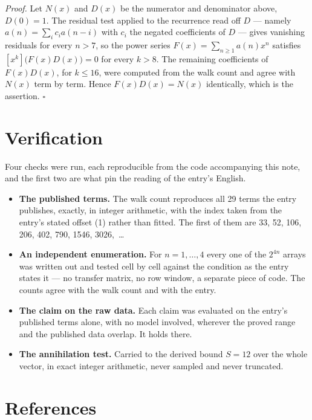 \documentclass[11pt]{article}
\theoremstyle{definition}
\begin{document}
{\itshape Proof.} Let $N(x)$ and $D(x)$ be the numerator and denominator above, $D(0)=1$. The residual test applied to the recurrence read off $D$ --- namely $a(n) = \sum_i c_i a(n-i)$ with $c_i$ the negated coefficients of $D$ --- gives vanishing residuals for every $n > 7$, so the power series $F(x)=\sum_{n\ge 1}a(n)x^n$ satisfies $[x^k]\bigl(F(x)D(x)\bigr) = 0$ for every $k > 8$. The remaining coefficients of $F(x)D(x)$, for $k \le 16$, were computed from the walk count and agree with $N(x)$ term by term. Hence $F(x)D(x) = N(x)$ identically, which is the assertion. $\square$

\section{Verification}

Four checks were run, each reproducible from the code accompanying this note, and the first two are what pin the reading of the entry's English.

\begin{itemize}

\item {\bfseries The published terms.} The walk count reproduces all 29 terms the entry publishes, exactly, in integer arithmetic, with the index taken from the entry's stated offset (1) rather than fitted. The first of them are 33, 52, 106, 206, 402, 790, 1546, 3026,~\dots

\item {\bfseries An independent enumeration.} For $n = 1,\dots,4$ every one of the $2^{4n}$ arrays was written out and tested cell by cell against the condition as the entry states it --- no transfer matrix, no row window, a separate piece of code. The counts agree with the walk count and with the entry.

\item {\bfseries The claim on the raw data.} Each claim was evaluated on the entry's published terms alone, with no model involved, wherever the proved range and the published data overlap. It holds there.

\item {\bfseries The annihilation test.} Carried to the derived bound $S = 12$ over the whole vector, in exact integer arithmetic, never sampled and never truncated.

\end{itemize}

\section{References}
\end{document}
